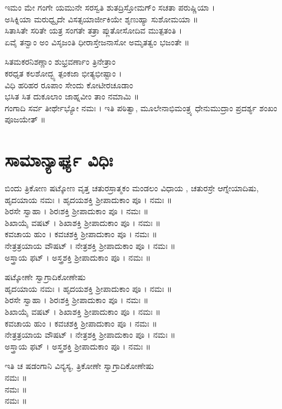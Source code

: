 ಇಮಂ ಮೇ ಗಂಗೇ ಯಮುನೇ ಸರಸ್ವತಿ ಶುತದ್ರಿಸ್ತೋಮಗ್ಂ ಸಚತಾ ಪರುಷ್ಣಿಯಾ ।\\
ಅಸಿಕ್ನಿಯಾ ಮರುಧ್ವೃದೇ ವಿಸತ್ಸಯಾರ್ಜೀಕಿಯೇ  ಶೃಣುಹ್ಯಾ ಸುಶೋಮಯಾ ॥\\
ಸಿತಾಸಿತೇ ಸರಿತೇ ಯತ್ರ ಸಂಗತೇ ತತ್ರಾ ಪ್ಲುತೋಸೋದಿವ ಮುತ್ಪತಂತಿ ।\\
ಏವೈ ತನ್ವಾಂ ಅಂ ವಿಸೃಜಂತಿ ಧೀರಾಸ್ತೇಜನಾಸೋ ಅಮೃತತ್ವಂ ಭಜಂತೇ ॥

ಸಿತಮಕರನಿಶಣ್ಣಾಂ ಶುಭ್ರವರ್ಣಾಂ ತ್ರಿನೇತ್ರಾಂ\\ಕರಧೃತ ಕಲಶೋದ್ಭ್ಯ ತ್ಪಂಕಜಾ ಭೀತ್ಯಭೀಷ್ಟಾಂ ।\\
ವಿಧಿ ಹರಿಹರ ರೂಪಾಂ ಸೇಂದು ಕೋಟೀರಚೂಡಾಂ\\ಭಸಿತ ಸಿತ ದುಕೂಲಾಂ ಜಾಹ್ನವೀಂ ತಾಂ ನಮಾಮಿ ॥\\
ಗಂಗಾದಿ ಸರ್ವ ತೀರ್ಥೇಭ್ಯೋ ನಮಃ । ಇತಿ ಪಠಿತ್ವಾ, ಮೂಲೇನಾಭಿಮಂತ್ರ್ಯ ಧೇನುಮುದ್ರಾಂ ಪ್ರದರ್ಶ್ಯ ಶಂಖಂ ಪೂಜಯೇತ್ ॥

\section{ಸಾಮಾನ್ಯಾರ್ಘ್ಯ ವಿಧಿಃ}
ಬಿಂದು ತ್ರಿಕೋಣ ಷಟ್ಕೋಣ ವೃತ್ತ ಚತುರಸ್ರಾತ್ಮಕಂ ಮಂಡಲಂ ವಿಧಾಯ , ಚತುರಸ್ರೇ ಆಗ್ನೇಯಾದಿಷು,\\
 ಹೃದಯಾಯ ನಮಃ । ಹೃದಯಶಕ್ತಿ ಶ್ರೀಪಾದುಕಾಂ ಪೂ । ನಮಃ ॥\\
 ಶಿರಸೇ ಸ್ವಾಹಾ । ಶಿರಃಶಕ್ತಿ ಶ್ರೀಪಾದುಕಾಂ ಪೂ । ನಮಃ ॥\\
 ಶಿಖಾಯೈ ವಷಟ್ । ಶಿಖಾಶಕ್ತಿ ಶ್ರೀಪಾದುಕಾಂ ಪೂ । ನಮಃ ॥\\
 ಕವಚಾಯ ಹುಂ । ಕವಚಶಕ್ತಿ ಶ್ರೀಪಾದುಕಾಂ ಪೂ । ನಮಃ ॥\\
 ನೇತ್ರತ್ರಯಾಯ ವೌಷಟ್ । ನೇತ್ರಶಕ್ತಿ ಶ್ರೀಪಾದುಕಾಂ ಪೂ । ನಮಃ ॥\\
 ಅಸ್ತ್ರಾಯ ಫಟ್ । ಅಸ್ತ್ರಶಕ್ತಿ ಶ್ರೀಪಾದುಕಾಂ ಪೂ । ನಮಃ ॥

ಷಟ್ಕೋಣೇ ಸ್ವಾಗ್ರಾದಿಕೋಣೇಷು\\
 ಹೃದಯಾಯ ನಮಃ । ಹೃದಯಶಕ್ತಿ ಶ್ರೀಪಾದುಕಾಂ ಪೂ । ನಮಃ ॥\\
 ಶಿರಸೇ ಸ್ವಾಹಾ । ಶಿರಃಶಕ್ತಿ ಶ್ರೀಪಾದುಕಾಂ ಪೂ । ನಮಃ ॥\\
 ಶಿಖಾಯೈ ವಷಟ್ । ಶಿಖಾಶಕ್ತಿ ಶ್ರೀಪಾದುಕಾಂ ಪೂ । ನಮಃ ॥\\
 ಕವಚಾಯ ಹುಂ । ಕವಚಶಕ್ತಿ ಶ್ರೀಪಾದುಕಾಂ ಪೂ । ನಮಃ ॥\\
 ನೇತ್ರತ್ರಯಾಯ ವೌಷಟ್ । ನೇತ್ರಶಕ್ತಿ ಶ್ರೀಪಾದುಕಾಂ ಪೂ । ನಮಃ ॥\\
 ಅಸ್ತ್ರಾಯ ಫಟ್ । ಅಸ್ತ್ರಶಕ್ತಿ ಶ್ರೀಪಾದುಕಾಂ ಪೂ । ನಮಃ ॥

ಇತಿ ಚ ಷಡಂಗಾನಿ ವಿನ್ಯಸ್ಯ, ತ್ರಿಕೋಣೇ ಸ್ವಾಗ್ರಾದಿಕೋಣೇಷು\\
 ನಮಃ ॥\\
 ನಮಃ ॥\\
 ನಮಃ ॥\\

